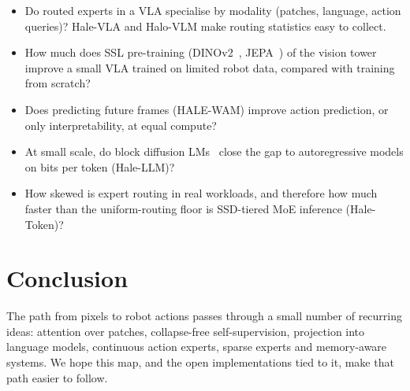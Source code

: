 \documentclass[11pt]{article}
\begin{document}
\begin{itemize}
  \item Do routed experts in a VLA specialise by modality (patches, language, action
        queries)? Hale-VLA and Halo-VLM make routing statistics easy to collect.
  \item How much does SSL pre-training (DINOv2~\cite{oquab2023dinov2}, JEPA~\cite{assran2023ijepa})
        of the vision tower improve a small VLA trained on limited robot data, compared with
        training from scratch?
  \item Does predicting future frames (HALE-WAM) improve action prediction, or only
        interpretability, at equal compute?
  \item At small scale, do block diffusion LMs~\cite{arriola2025bd3lm} close the gap to
        autoregressive models on bits per token (Hale-LLM)?
  \item How skewed is expert routing in real workloads, and therefore how much faster than
        the uniform-routing floor is SSD-tiered MoE inference (Hale-Token)?
\end{itemize}

\section{Conclusion}

The path from pixels to robot actions passes through a small number of recurring ideas:
attention over patches, collapse-free self-supervision, projection into language models,
continuous action experts, sparse experts and memory-aware systems. We hope this map, and
the open implementations tied to it, make that path easier to follow.



\end{document}
